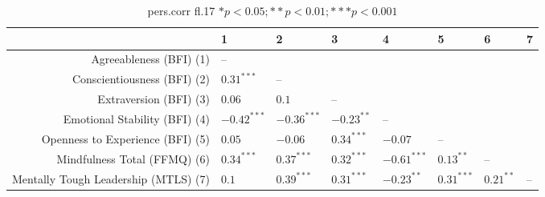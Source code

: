 \begin{table}[ht]
\centering
\begin{tabular}{rlllllll}
  \hline
 & 1 & 2 & 3 & 4 & 5 & 6 & 7 \\ 
  \hline
Agreeableness (BFI) (1) & -- &  &  &  &  &  &  \\ 
  Conscientiousness (BFI) (2) & $0.31^{***}$ & -- &  &  &  &  &  \\ 
  Extraversion (BFI) (3) & $0.06$ & $0.1$ & -- &  &  &  &  \\ 
  Emotional Stability (BFI) (4) & $-0.42^{***}$ & $-0.36^{***}$ & $-0.23^{**}$ & -- &  &  &  \\ 
  Openness to Experience (BFI) (5) & $0.05$ & $-0.06$ & $0.34^{***}$ & $-0.07$ & -- &  &  \\ 
  Mindfulness Total (FFMQ) (6) & $0.34^{***}$ & $0.37^{***}$ & $0.32^{***}$ & $-0.61^{***}$ & $0.13^{**}$ & -- &  \\ 
  Mentally Tough Leadership (MTLS) (7) & $0.1$ & $0.39^{***}$ & $0.31^{***}$ & $-0.23^{**}$ & $0.31^{***}$ & $0.21^{**}$ & -- \\ 
   \hline
\end{tabular}
\caption{pers.corr fl.17 $* p < 0.05; ** p < 0.01; *** p < 0.001$} 
\label{freq_corr.pers.corr.fl.17}
\end{table}
